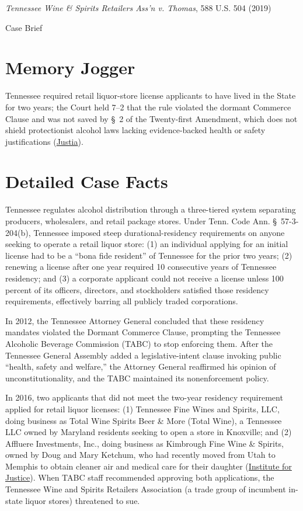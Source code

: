 \documentclass[12pt]{article}
\begin{document}
\begin{center}
{\LARGE \textit{Tennessee Wine \& Spirits Retailers Ass'n v. Thomas}, 588 U.S. 504 (2019)\par}
\vspace{0.8em}
{\large Case Brief\par}
\end{center}
\vspace{1em}

\section{Memory Jogger}
Tennessee required retail liquor-store license applicants to have lived in the State for two years; the Court held 7--2 that the rule violated the dormant Commerce Clause and was not saved by \S~2 of the Twenty-first Amendment, which does not shield protectionist alcohol laws lacking evidence-backed health or safety justifications (\href{https://supreme.justia.com/cases/federal/us/588/18-96/}{Justia}).

\section{Detailed Case Facts}
Tennessee regulates alcohol distribution through a three-tiered system separating producers, wholesalers, and retail package stores. Under Tenn. Code Ann. \S~57-3-204(b), Tennessee imposed steep durational-residency requirements on anyone seeking to operate a retail liquor store: (1) an individual applying for an initial license had to be a ``bona fide resident'' of Tennessee for the prior two years; (2) renewing a license after one year required 10 consecutive years of Tennessee residency; and (3) a corporate applicant could not receive a license unless 100 percent of its officers, directors, and stockholders satisfied those residency requirements, effectively barring all publicly traded corporations.

In 2012, the Tennessee Attorney General concluded that these residency mandates violated the Dormant Commerce Clause, prompting the Tennessee Alcoholic Beverage Commission (TABC) to stop enforcing them. After the Tennessee General Assembly added a legislative-intent clause invoking public ``health, safety and welfare,'' the Attorney General reaffirmed his opinion of unconstitutionality, and the TABC maintained its nonenforcement policy.

In 2016, two applicants that did not meet the two-year residency requirement applied for retail liquor licenses: (1) Tennessee Fine Wines and Spirits, LLC, doing business as Total Wine Spirits Beer \& More (Total Wine), a Tennessee LLC owned by Maryland residents seeking to open a store in Knoxville; and (2) Affluere Investments, Inc., doing business as Kimbrough Fine Wine \& Spirits, owned by Doug and Mary Ketchum, who had recently moved from Utah to Memphis to obtain cleaner air and medical care for their daughter (\href{https://ij.org/case/tennessee-wine-and-spirits-retailers-association-v-thomas/}{Institute for Justice}). When TABC staff recommended approving both applications, the Tennessee Wine and Spirits Retailers Association (a trade group of incumbent in-state liquor stores) threatened to sue.
\end{document}
